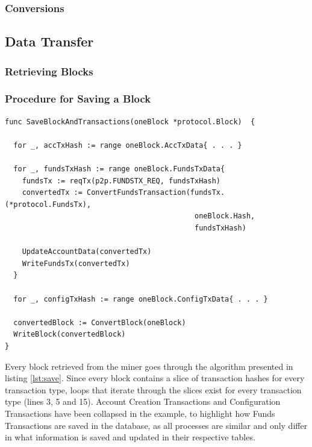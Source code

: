 \subsubsection{Conversions}

\subsection{Data Transfer}

\subsubsection{Retrieving Blocks}


\subsubsection{Procedure for Saving a Block}

\begin{lstlisting}[caption={Saving a Block and Its Transactions to the Database},captionpos=b,label={lst:save}]
func SaveBlockAndTransactions(oneBlock *protocol.Block)  {

  for _, accTxHash := range oneBlock.AccTxData{ . . . }

  for _, fundsTxHash := range oneBlock.FundsTxData{
    fundsTx := reqTx(p2p.FUNDSTX_REQ, fundsTxHash)
    convertedTx := ConvertFundsTransaction(fundsTx.(*protocol.FundsTx), 
    										oneBlock.Hash, 
											fundsTxHash)

    UpdateAccountData(convertedTx)
    WriteFundsTx(convertedTx)
  }

  for _, configTxHash := range oneBlock.ConfigTxData{ . . . }

  convertedBlock := ConvertBlock(oneBlock)
  WriteBlock(convertedBlock)
}
\end{lstlisting}

Every block retrieved from the miner goes through the algorithm presented in listing \ref{lst:save}. Since every block contains a slice of transaction hashes for every transaction type, loops that iterate through the slices exist for every transaction type (lines 3, 5 and 15). Account Creation Transactions and Configuration Transactions have been collapsed in the example, to highlight how Funds Transactions are saved in the database, as all processes are similar and only differ in what information is saved and updated in their respective tables.

